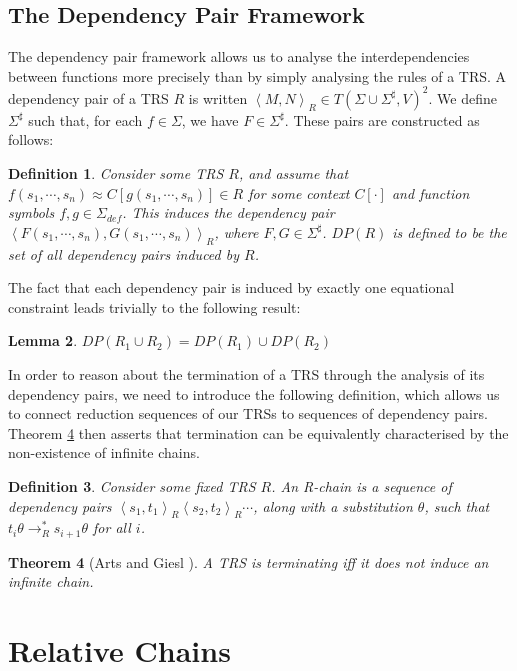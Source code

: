 \documentclass{article}
\newtheorem{theorem}{Theorem}[section]
\newtheorem{lemma}[theorem]{Lemma}
\newtheorem{definition}[theorem]{Definition}
\newcommand{\dpair}[2]{\left\langle #1, #2 \right\rangle}
\begin{document}
\subsection{The Dependency Pair Framework}

The dependency pair framework \cite{arts2000dependency} allows us to analyse the interdependencies between functions more precisely than by simply analysing the rules of a TRS. A dependency pair of a TRS $R$ is written $\dpair{M}{N}_R \in T(\Sigma \cup \Sigma^\sharp, V)^2$. We define $\Sigma^\sharp$ such that, for each $f \in \Sigma$, we have $F \in \Sigma^\sharp$. These pairs are constructed as follows:
\begin{definition}
    Consider some TRS $R$, and assume that $f(s_1, \cdots, s_n) \approx C[g(s_1, \cdots, s_n)] \in R$ for some context $C[\cdot]$ and function symbols $f, g \in \Sigma_{def}$. This induces the \emph{dependency pair} $\dpair{F (s_1, \cdots, s_n)}{G(s_1, \cdots, s_n)}_R $, where $F, G \in \Sigma^\sharp$. $DP(R)$ is defined to be the set of all dependency pairs induced by $R$.
\end{definition}
The fact that each dependency pair is induced by exactly one equational constraint leads trivially to the following result:
\begin{lemma} \label{thm:dep_pair_mod}
    $DP(R_1 \cup R_2) = DP(R_1) \cup DP(R_2)$
\end{lemma}
In order to reason about the termination of a TRS through the analysis of its dependency pairs, we need to introduce the following definition, which allows us to connect reduction sequences of our TRSs to sequences of dependency pairs. Theorem \ref{thm:no_infinite_chains} then asserts that termination can be equivalently characterised by the non-existence of infinite chains.
\begin{definition}
    Consider some fixed TRS $R$. An \emph{R-chain} is a sequence of dependency pairs $\dpair{s_1}{t_1}_R \dpair{s_2}{t_2}_R \cdots$, along with a substitution $\theta$, such that $t_i \theta \rightarrow_R^* s_{i+1}\theta$ for all $i$.
\end{definition}
\begin{theorem}[Arts and Giesl \cite{arts2000dependency}]\label{thm:no_infinite_chains}
    A TRS is terminating iff it does not induce an infinite chain.
\end{theorem} 

\section{Relative Chains}
\end{document}

